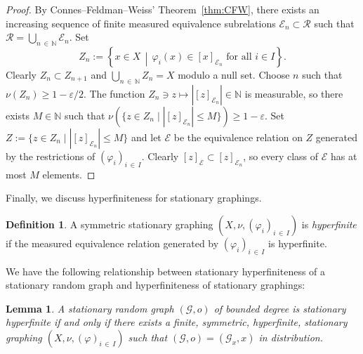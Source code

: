 \documentclass[10pt]{amsart}
\newtheorem{lemm}[theo]{Lemma}\newtheorem{prop}[theo]{Proposition}\newtheorem{coro}[theo]{Corollary}\newtheorem{conj}[theo]{Conjecture}
\theoremstyle{definition}\newtheorem{defi}[theo]{Definition}\newtheorem{rema}[theo]{Remark}\newtheorem{exam}[theo]{Example}\newtheorem{exem}[theo]{Example}\newtheorem{nota}[theo]{Notation}
\newcommand{\bbN}{\mathbb{N}}
\newcommand{\calR}{\mathcal{R}}
\newcommand{\calE}{\mathcal{E}}
\newcommand{\calG}{\mathcal{G}}
\begin{document}
\begin{proof}
By Connes--Feldman--Weiss' Theorem~\ref{thm:CFW}, there exists an increasing sequence of finite measured equivalence subrelations $\calE_n\subset \calR$ such that $\calR=\bigcup_{n\,\in\,\bbN} \calE_n$. Set
\[
Z_n:=\left\{x\in X \,\middle|\, \varphi_i(x)\in [x]_{\calE_n} \text{ for all } i\in I\right\}.
\]
Clearly $Z_n\subset Z_{n+1}$ and $\bigcup_{n\,\in\,\bbN} Z_n=X$ modulo a null set. Choose $n$ such that $\nu(Z_n)\geq 1-\varepsilon/2$. The function $Z_n\ni z\mapsto |[z]_{\calE_n}|\in \bbN$ is measurable, so there exists $M\in\bbN$ such that $\nu(\{z\in Z_n \mid |[z]_{\calE_n}|\leq M\})\geq 1-\varepsilon$. Set $Z:=\{z\in Z_n \mid |[z]_{\calE_n}|\leq M\}$ and let $\calE$ be the equivalence relation on $Z$ generated by the restrictions of $(\varphi_i)_{i\,\in\,I}$. Clearly $[z]_{\calE}\subset [z]_{\calE_n}$, so every class of $\calE$ has at most $M$ elements.
\end{proof}

Finally, we discuss hyperfiniteness for stationary graphings.

\begin{defi}\label{dfn:StationaryHyperfinite}
A symmetric stationary graphing $(X,\nu,(\varphi_i)_{i\,\in\,I})$ is \emph{hyperfinite} if the measured equivalence relation generated by $(\varphi_i)_{i\,\in\,I}$ is hyperfinite.
\end{defi}

We have the following relationship between stationary hyperfiniteness of a stationary random graph and hyperfiniteness of stationary graphings:

\begin{lemm}\label{lem:equiv_hyperfinites}
A stationary random graph $(\calG,o)$ of bounded degree is stationary hyperfinite if and only if there exists a finite, symmetric, hyperfinite, stationary graphing $(X,\nu,(\varphi)_{i\,\in\,I})$ such that $(\calG,o)=(\calG_x,x)$ in distribution.
\end{lemm}
\end{document}
